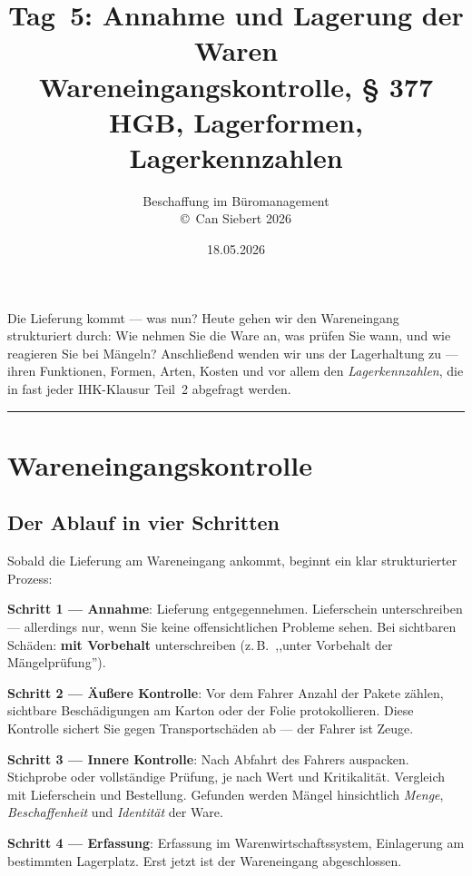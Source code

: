 \documentclass[11pt, a4paper]{article}
\title{\vspace*{-1.5cm}\Huge\bfseries\color{bfwPrimaryDark}Tag~5: Annahme und Lagerung der Waren\\[0.4em]
  \large\color{bfwInkSoft}\textnormal{Wareneingangskontrolle, § 377 HGB, Lagerformen, Lagerkennzahlen}}
\author{\textsf{Beschaffung im Büromanagement}\\
\textsf{\small\copyright\ Can Siebert\,\textperiodcentered\,2026}}
\date{18.05.2026}
\begin{document}
\maketitle
\thispagestyle{empty}

\vspace{1em}
\begin{merksatz}[title={\bfseries Worum geht es heute?}]
Die Lieferung kommt --- was nun? Heute gehen wir den Wareneingang strukturiert durch:
Wie nehmen Sie die Ware an, was prüfen Sie wann, und wie reagieren Sie bei Mängeln?
Anschließend wenden wir uns der Lagerhaltung zu --- ihren Funktionen, Formen, Arten,
Kosten und vor allem den \emph{Lagerkennzahlen}, die in fast jeder IHK-Klausur Teil~2
abgefragt werden.
\end{merksatz}

\tableofcontents
\vspace{1em}
\hrule
\vspace{1em}

\section{Wareneingangskontrolle}

\subsection{Der Ablauf in vier Schritten}

Sobald die Lieferung am Wareneingang ankommt, beginnt ein klar strukturierter Prozess:

\textbf{Schritt 1 --- Annahme}: Lieferung entgegennehmen. Lieferschein unterschreiben ---
allerdings nur, wenn Sie keine offensichtlichen Probleme sehen. Bei sichtbaren Schäden:
\textbf{mit Vorbehalt} unterschreiben (z.\,B.\ ,,unter Vorbehalt der Mängelprüfung'').

\textbf{Schritt 2 --- Äußere Kontrolle}: Vor dem Fahrer Anzahl der Pakete zählen,
sichtbare Beschädigungen am Karton oder der Folie protokollieren. Diese Kontrolle
sichert Sie gegen Transportschäden ab --- der Fahrer ist Zeuge.

\textbf{Schritt 3 --- Innere Kontrolle}: Nach Abfahrt des Fahrers auspacken. Stichprobe
oder vollständige Prüfung, je nach Wert und Kritikalität. Vergleich mit Lieferschein
und Bestellung. Gefunden werden Mängel hinsichtlich \emph{Menge}, \emph{Beschaffenheit}
und \emph{Identität} der Ware.

\textbf{Schritt 4 --- Erfassung}: Erfassung im Warenwirtschafts­system, Einlagerung am
bestimmten Lagerplatz. Erst jetzt ist der Wareneingang abgeschlossen.
\end{document}
